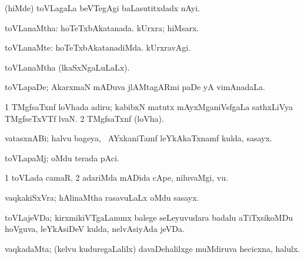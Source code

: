 {{{{{{\bentry
{} 
\gl{\nA}
\expl{}
\bmng
(hiMde) toVLagaLa beVTegAgi baLasutitxdadx nAyi. 
\emng
\eentry

\bentry
{} 
\gl{\gu}
\expl{}
\bmng
toVLanaMtha: 
\banum
{} hoTeTxbAkatanada. 
 kUrxra; hiMsarx. 
\eanum
\emng
\eentry

\bentry
{} 
\gl{\kirxvi}
\expl{}
\bmng
toVLanaMte: 
\banum
{} hoTeTxbAkatanadiMda. 
 kUrxravAgi. 
\eanum
\emng
\eentry

\bentry
{} 
\gl{\gu}
\expl{}
\bmng
toVLanaMtha (lkaSxNgaLuLaLx). 
\emng
\eentry

\bentry
{} 
\gl{\nA}
\expl{}
\bmng
toVLapaDe; AkarxmaN mADuva jlAMtagARmi paDe yA vimAnadaLa. 
\emng
\eentry

\bentry
{} 
\gl{\nA}
\expl{}
\bmng
\bnum
\num{1} TMgfsaTxnf loVhada adiru; kabibxN matutx mAyxMganiVsfgaLa sathxLiVya TMgfseTxVTf lvaN. 
\num{2} TMgfsaTxnf (loVha). 
\enum
\emng
\eentry

\bentry 
{} 
\gl{\nA}
\expl{}
\bmng
{} 
\emng
\eentry

\bentry
{} 
\gl{\nA}
\bmng
vatasxnABi; halvu bageya, \kanmu\ AYxkaniTamf leYkAkaTxnamf kulda, sasayx. 
\emng
\eentry

\bentry
{} 
\gl{\nA}
\expl{}
\bmng
toVLapaMj; oMdu terada pAci. 
\emng
\eentry

\bentry
{} 
\gl{\nA}
\expl{}
\bmng
{} 
\emng
\eentry

\bentry
{} 
\gl{\nA}
\expl{}
\bmng
\bnum
\num{1} toVLada camaR. 
\num{2} adariMda mADida cApe, niluvaMgi, \mo vu. 
\enum
\emng
\eentry

\bentry
{} 
\gl{\nA}
\expl{}
\bmng
vaqkakiSxVra; hAlinaMtha rasavuLaLx oMdu sasayx. 
\emng
\eentry

\bentry
{} 
\gl{\nA}
\expl{}
\bmng
toVLajeVDa; kirxmikiVTgaLanunx balege seLeyuvudara badalu aTiTxsikoMDu hoVguva, leYkAsiDeV kulda, nelvAsiyAda jeVDa. 
\emng
\eentry

\bentry
{} 
\gl{\nA}
\expl{}
\bmng
vaqkadaMta; (kelvu kuduregaLalilx) davaDehalilxge muMdiruva hecicxna, halulx. 
\emng
\eentry

}}}}}}
